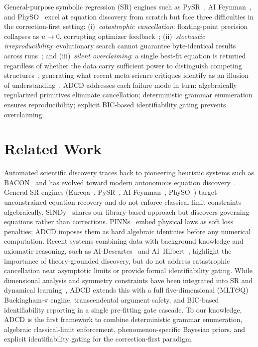 \documentclass{article}
\begin{document}
General-purpose symbolic regression (SR) engines such as
PySR~\cite{cranmer2020,cranmer2023}, AI Feynman~\cite{udrescu2020}, and
PhySO~\cite{tenachi2023} excel at equation discovery from scratch but face
three difficulties in the correction-first setting:
(i)~\emph{catastrophic cancellation}: floating-point precision collapses as
$u\to0$, corrupting optimizer feedback~\cite{ieee754};
(ii)~\emph{stochastic irreproducibility}: evolutionary search cannot guarantee
byte-identical results across runs~\cite{bongard2007,schmidt2009}; and
(iii)~\emph{silent overclaiming}: a single best-fit equation is returned
regardless of whether the data carry sufficient power to distinguish competing
structures~\cite{lacava2021}, generating what recent meta-science critiques identify
as an illusion of understanding~\cite{messeri2024,krenn2022}.
ADCD addresses each failure mode in turn: algebraically regularized primitives
eliminate cancellation; deterministic grammar enumeration ensures reproducibility;
explicit BIC-based identifiability gating prevents overclaiming.

\section{Related Work}

Automated scientific discovery traces back to pioneering heuristic systems such as
BACON~\cite{langley1987} and has evolved toward modern autonomous equation
discovery~\cite{kramer2026,makke2024,karagiorgi2022}.
General SR engines (Eureqa~\cite{schmidt2009}, PySR~\cite{cranmer2020,cranmer2023},
AI Feynman~\cite{udrescu2020,udrescu2020b}, PhySO~\cite{tenachi2023})
target unconstrained equation recovery and do not enforce classical-limit
constraints algebraically.
SINDy~\cite{brunton2016} shares our library-based approach but discovers
governing equations rather than corrections.
PINNs~\cite{raissi2019,karniadakis2021} embed physical laws as soft loss penalties;
ADCD imposes them as hard algebraic identities before any numerical computation.
Recent systems combining data with background knowledge and axiomatic reasoning,
such as AI-Descartes~\cite{cornelio2023} and AI~Hilbert~\cite{corywright2024},
highlight the importance of theory-grounded discovery, but do not address
catastrophic cancellation near asymptotic limits or provide formal identifiability gating.
While dimensional analysis and symmetry constraints have been integrated into
SR and dynamical learning~\cite{tenachi2023,petersen2021,otto2025},
ADCD extends this with a full five-dimensional (MLT$\Theta$Q) Buckingham-$\pi$ engine,
transcendental argument safety, and BIC-based identifiability reporting
in a single pre-fitting gate cascade.
To our knowledge, ADCD is the first framework to combine deterministic grammar
enumeration, algebraic classical-limit enforcement, phenomenon-specific Bayesian
priors, and explicit identifiability gating for the correction-first paradigm.
\end{document}
